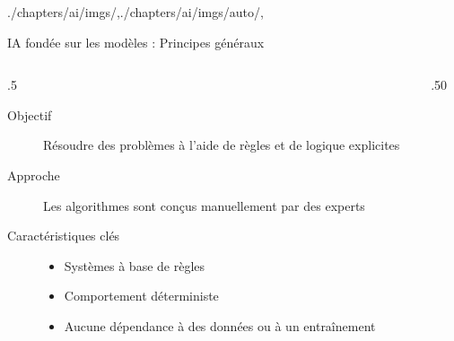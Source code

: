 \begin{graphicspathcontext}{{./chapters/ai/imgs/},{./chapters/ai/imgs/auto/},\old}

\begin{frame}[fragile,t]{{IA fondée sur les modèles :} Principes généraux}
	\small
	\vspace{-.15cm}
	\begin{columns}
		\begin{column}{.5\linewidth}
			\begin{block}{}
				\begin{description}
				\item[Objectif] Résoudre des problèmes à l'aide de règles et de logique explicites
				\item[Approche] Les algorithmes sont conçus manuellement par des experts
				\item[Caractéristiques clés]
					\begin{itemize}
					\item Systèmes à base de règles
					\item Comportement déterministe
					\item Aucune dépendance à des données ou à un entraînement
					\end{itemize}
				\end{description}
			\end{block}
		\end{column}
		\begin{column}{.50\linewidth}
			\vspace{-.5cm}
		\end{column}
	\end{columns}
	\normalsize
\end{frame}

\end{graphicspathcontext}

\endinput

